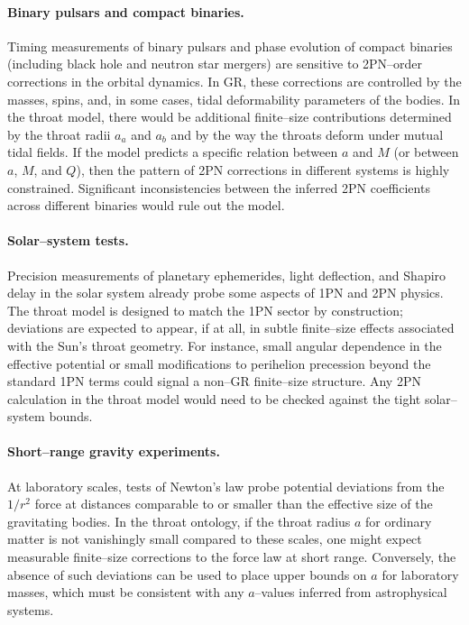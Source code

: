 \documentclass[12pt]{article}
\begin{document}
\paragraph{Binary pulsars and compact binaries.}
Timing measurements of binary pulsars and phase evolution of compact
binaries (including black hole and neutron star mergers) are sensitive to
2PN--order corrections in the orbital dynamics.  In GR, these corrections
are controlled by the masses, spins, and, in some cases, tidal deformability
parameters of the bodies.  In the throat model, there would be additional
finite--size contributions determined by the throat radii $a_a$ and $a_b$
and by the way the throats deform under mutual tidal fields.  If the model
predicts a specific relation between $a$ and $M$ (or between $a$, $M$, and
$Q$), then the pattern of 2PN corrections in different systems is highly
constrained.  Significant inconsistencies between the inferred 2PN
coefficients across different binaries would rule out the model.

\paragraph{Solar--system tests.}
Precision measurements of planetary ephemerides, light deflection, and
Shapiro delay in the solar system already probe some aspects of 1PN and
2PN physics.  The throat model is designed to match the 1PN sector by
construction; deviations are expected to appear, if at all, in subtle
finite--size effects associated with the Sun's throat geometry.  For
instance, small angular dependence in the effective potential or small
modifications to perihelion precession beyond the standard 1PN terms could
signal a non--GR finite--size structure.  Any 2PN calculation in the throat
model would need to be checked against the tight solar--system bounds.

\paragraph{Short--range gravity experiments.}
At laboratory scales, tests of Newton's law probe potential deviations from
the $1/r^2$ force at distances comparable to or smaller than the effective
size of the gravitating bodies.  In the throat ontology, if the throat
radius $a$ for ordinary matter is not vanishingly small compared to these
scales, one might expect measurable finite--size corrections to the force
law at short range.  Conversely, the absence of such deviations can be used
to place upper bounds on $a$ for laboratory masses, which must be consistent
with any $a$--values inferred from astrophysical systems.
\end{document}
